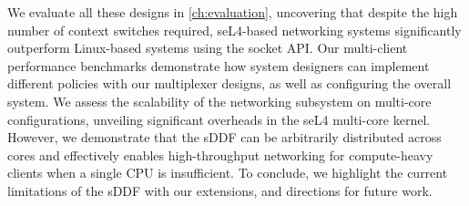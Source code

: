 We evaluate all these designs in \autoref{ch:evaluation}, uncovering that despite the high number of context switches
required, seL4-based networking systems significantly outperform Linux-based systems using the socket API.
Our multi-client performance benchmarks demonstrate how system designers can implement different policies with our
multiplexer designs, as well as configuring the overall system. We assess the scalability of the networking subsystem
on multi-core configurations, unveiling significant overheads in the seL4 multi-core kernel. However, we demonstrate that
the sDDF can be arbitrarily distributed across cores and effectively enables high-throughput networking for
compute-heavy clients when a single CPU is insufficient. To conclude, we highlight
the current limitations of the sDDF with our extensions, and directions for future work. 

